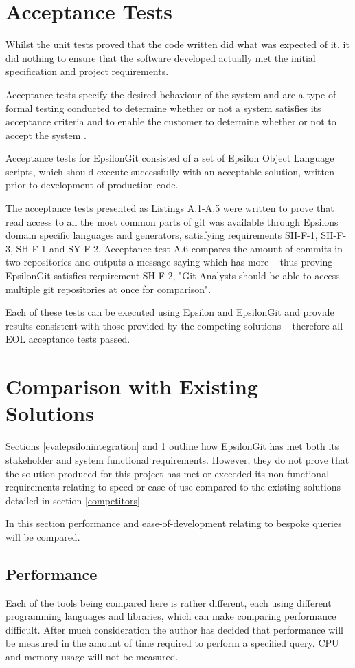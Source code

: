 \documentclass[11pt]{book}
\begin{document}
\section{Acceptance Tests}
\label{evalacceptance}
Whilst the unit tests proved that the code written did what was expected of it, it did nothing to ensure that the software developed actually met the initial specification and project requirements.

Acceptance tests specify the desired behaviour of the system and are a type of formal testing conducted to determine whether or not a system satisfies its acceptance criteria and to enable the customer to determine whether or not to accept the system \cite{acceptancetests1}\cite{acceptancetests2}. 

Acceptance tests for EpsilonGit consisted of a set of Epsilon Object Language scripts, which should execute successfully with an acceptable solution, written prior to development of production code. 

The acceptance tests presented as Listings A.1-A.5 were written to prove that read access to all the most common parts of git was available through Epsilons domain specific languages and generators, satisfying requirements SH-F-1, SH-F-3, SH-F-1 and SY-F-2. Acceptance test A.6 compares the amount of commits in two repositories and outputs a message saying which has more -- thus proving EpsilonGit satisfies requirement SH-F-2, "Git Analysts should be able to access multiple git repositories at once for comparison".

Each of these tests can be executed using Epsilon and EpsilonGit and provide results consistent with those provided by the competing solutions -- therefore all EOL acceptance tests passed.

\section{Comparison with Existing Solutions}
Sections \ref{evalepsilonintegration} and \ref{evalacceptance} outline how EpsilonGit has met both its stakeholder and system functional requirements. However, they do not prove that the solution produced for this project has met or exceeded its non-functional requirements relating to speed or ease-of-use compared to the existing solutions detailed in section \ref{competitors}.

In this section performance and ease-of-development relating to bespoke queries will be compared.

\subsection{Performance}
Each of the tools being compared here is rather different, each using different programming languages and libraries, which can make comparing performance difficult. After much consideration the author has decided that performance will be measured in the amount of time required to perform a specified query. CPU and memory usage will not be measured.
\end{document}

